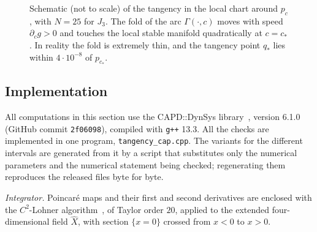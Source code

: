 \documentclass[11pt]{amsart}
\theoremstyle{definition}
\theoremstyle{remark}
\newcommand{\Wu}{W^u}
\newcommand{\Ws}{W^s}
\newcommand{\loc}{\mathrm{loc}}
\newcommand{\cs}{c_*}
\begin{document}
\begin{figure}[t]
\centering
{}
\caption{Schematic (not to scale) of the tangency in the local chart around $p_c$, with $N=25$ for $J_3$. The
fold of the arc $\Gamma(\cdot,c)$ moves with speed $\partial_cg>0$ and touches the local stable manifold
quadratically at $c=\cs$. In reality the fold is extremely thin, and the tangency point $q_*$ lies within
$4\cdot10^{-8}$ of $p_{\cs}$.}
\label{fig:schematic}
\end{figure}

\subsection{Implementation}\label{sec:impl}
All computations in this section use the CAPD::DynSys library~\cite{CAPD21}, version 6.1.0 (GitHub
commit \texttt{2f06098}), compiled with \texttt{g++} 13.3. All the checks are implemented in one
program, \texttt{tangency\_cap.cpp}. The variants for the different intervals are generated from it by a
script that substitutes only the numerical parameters and the numerical statement being checked;
regenerating them reproduces the released files byte for byte.

\emph{Integrator.} Poincar\'e maps and their first and second derivatives are enclosed with the
$C^2$-Lohner algorithm~\cite{Lohner92,WZ11}, of Taylor order $20$, applied to the extended
four-dimensional field $\hat X$, with section $\{x=0\}$ crossed from $x<0$ to $x>0$.
\end{document}
